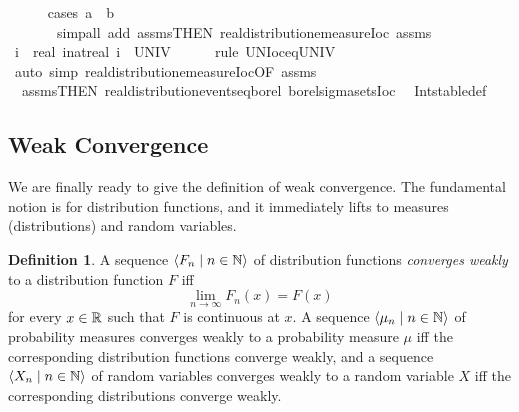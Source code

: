 \documentclass[leqno]{article}
\theoremstyle{definition}
\newtheorem{definition}[theorem]{Definition}
\newcommand{\bldseq}[2]{\langle{#1}\mid{#2}\rangle}
\begin{document}
\begin{isabellebody}
\ \ \ \ \isamarkupfalse%
\ {\isacharparenleft}cases\ {\isachardoublequoteopen}a\ {\isasymle}\ b{\isachardoublequoteclose}{\isacharparenright}\isanewline
\ \ \ \ \ \ \ {\isacharparenleft}simp{\isacharunderscore}all\ add{\isacharcolon}\ assms{\isacharparenleft}{}{\isacharcomma}{}{\isacharparenright}{\isacharbrackleft}THEN\ real{\isacharunderscore}distribution{\isachardot}emeasure{\isacharunderscore}Ioc{\isacharbrackright}\ assms{\isacharparenleft}{}{\isacharparenright}{\isacharparenright}\isanewline
{}\isamarkupfalse%
\isanewline
\ \ \isamarkupfalse%
\ {\isachardoublequoteopen}{\isacharparenleft}{\isasymUnion}i{\isachardot}\ {\isacharbraceleft}{\isacharminus}\ real\ {\isacharparenleft}i{\isacharcolon}{\isacharcolon}nat{\isacharparenright}{\isacharless}{\isachardot}{\isachardot}real\ i{\isacharbraceright}{\isacharparenright}\ {\isacharequal}\ UNIV{\isachardoublequoteclose}\isanewline
\ \ \ \ \isamarkupfalse%
\ {\isacharparenleft}rule\ UN{\isacharunderscore}Ioc{\isacharunderscore}eq{\isacharunderscore}UNIV{\isacharparenright}\isanewline
{}\isamarkupfalse%
\ {\isacharparenleft}auto\ simp{\isacharcolon}\ real{\isacharunderscore}distribution{\isachardot}emeasure{\isacharunderscore}Ioc{\isacharbrackleft}OF\ assms{\isacharparenleft}{}{\isacharparenright}{\isacharbrackright}\isanewline
\ \ assms{\isacharparenleft}{}{\isacharcomma}{}{\isacharparenright}{\isacharbrackleft}THEN\ real{\isacharunderscore}distribution{\isachardot}events{\isacharunderscore}eq{\isacharunderscore}borel{\isacharbrackright}\ borel{\isacharunderscore}sigma{\isacharunderscore}sets{\isacharunderscore}Ioc\isanewline
\ \ Int{\isacharunderscore}stable{\isacharunderscore}def{\isacharparenright}%
\end{isabellebody}

\subsection{Weak Convergence}

We are finally ready to give the definition of weak convergence. The fundamental notion is for distribution functions, and it immediately lifts to measures (distributions) and random variables.

\begin{definition}
A sequence $\bldseq{F_n}{n \in \N}$ of distribution functions {\em converges weakly} to a distribution function $F$ iff
\[ \lim_{n \rightarrow \infty} F_n(x) = F(x) \]
for every $x \in \mathbb{R}$ such that $F$ is continuous at $x$. A sequence $\bldseq{\mu_n}{n \in \N}$ of probability measures converges weakly to a probability measure $\mu$ iff the corresponding distribution functions converge weakly, and a sequence \linebreak $\bldseq{X_n}{n \in \N}$ of random variables converges weakly to a random variable $X$ iff the corresponding distributions converge weakly.
\end{definition}
\end{document}
